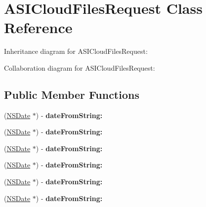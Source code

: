\hypertarget{interface_a_s_i_cloud_files_request}{
\section{\-A\-S\-I\-Cloud\-Files\-Request \-Class \-Reference}
\label{interface_a_s_i_cloud_files_request}
}


\-Inheritance diagram for \-A\-S\-I\-Cloud\-Files\-Request\-:


\-Collaboration diagram for \-A\-S\-I\-Cloud\-Files\-Request\-:
\subsection*{\-Public \-Member \-Functions}
\begin{DoxyCompactItemize}
\item 
\hypertarget{interface_a_s_i_cloud_files_request_afda57dc4c2fa1ec0efd906a2b59e00f4}{
(\hyperlink{class_n_s_date}{\-N\-S\-Date} $\ast$) -\/ {\bfseries date\-From\-String\-:}}
\label{interface_a_s_i_cloud_files_request_afda57dc4c2fa1ec0efd906a2b59e00f4}

\item 
\hypertarget{interface_a_s_i_cloud_files_request_afda57dc4c2fa1ec0efd906a2b59e00f4}{
(\hyperlink{class_n_s_date}{\-N\-S\-Date} $\ast$) -\/ {\bfseries date\-From\-String\-:}}
\label{interface_a_s_i_cloud_files_request_afda57dc4c2fa1ec0efd906a2b59e00f4}

\item 
\hypertarget{interface_a_s_i_cloud_files_request_afda57dc4c2fa1ec0efd906a2b59e00f4}{
(\hyperlink{class_n_s_date}{\-N\-S\-Date} $\ast$) -\/ {\bfseries date\-From\-String\-:}}
\label{interface_a_s_i_cloud_files_request_afda57dc4c2fa1ec0efd906a2b59e00f4}

\item 
\hypertarget{interface_a_s_i_cloud_files_request_afda57dc4c2fa1ec0efd906a2b59e00f4}{
(\hyperlink{class_n_s_date}{\-N\-S\-Date} $\ast$) -\/ {\bfseries date\-From\-String\-:}}
\label{interface_a_s_i_cloud_files_request_afda57dc4c2fa1ec0efd906a2b59e00f4}

\item 
\hypertarget{interface_a_s_i_cloud_files_request_afda57dc4c2fa1ec0efd906a2b59e00f4}{
(\hyperlink{class_n_s_date}{\-N\-S\-Date} $\ast$) -\/ {\bfseries date\-From\-String\-:}}
\label{interface_a_s_i_cloud_files_request_afda57dc4c2fa1ec0efd906a2b59e00f4}

\item 
\hypertarget{interface_a_s_i_cloud_files_request_afda57dc4c2fa1ec0efd906a2b59e00f4}{
(\hyperlink{class_n_s_date}{\-N\-S\-Date} $\ast$) -\/ {\bfseries date\-From\-String\-:}}
\label{interface_a_s_i_cloud_files_request_afda57dc4c2fa1ec0efd906a2b59e00f4}


\end{DoxyCompactItemize}
